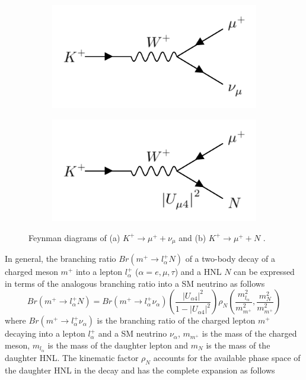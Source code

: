 \begin{figure}[ht!]
\begin{subfigure}[h]{0.4\linewidth}
\centering    
\includegraphics[width=\linewidth]{K_to_nu}
\caption{}
\end{subfigure}
\hfill
\begin{subfigure}[h]{0.4\linewidth}
\centering    
\includegraphics[width=\linewidth]{K_to_HNL}
\caption{}
\end{subfigure}%
\caption[kaonDiagram]{
	Feynman diagrams of (a) $K^+ \rightarrow \mu^+ + \nu_{\mu}$ and (b) $K^+ \rightarrow \mu^+ + N$ \cite{DavidePhD}.
}\label{fig:kaonDiagram}
\end{figure}

In general, the branching ratio $Br(m^+\rightarrow l^{+}_{\alpha}N)$ of a two-body decay of a charged meson $m^+$ into a lepton $l^{+}_{\alpha}$ ($\alpha=e,\mu,\tau$) and a HNL $N$ can be expressed in terms of the analogous branching ratio into a SM neutrino as follows \cite{HNLKelly}
\begin{equation}
	\label{eq:kaon_decay_hnl}
	Br(m^+\rightarrow l^{+}_{\alpha}N) = Br(m^+\rightarrow l^{+}_{\alpha}\nu_{\alpha})\left(\frac{|U_{\alpha 4}|^{2}}{1 - |U_{\alpha 4}|^{2}}\right)\rho_{N}\left(\frac{m^{2}_{l_{\alpha}}}{m^{2}_{m^+}}, \frac{m^{2}_{N}}{m^{2}_{m^+}} \right) 
\end{equation}
where $Br(m^+\rightarrow l^{+}_{\alpha}\nu_{\alpha})$ is the branching ratio of the charged lepton $m^+$ decaying into a lepton $l^+_{\alpha}$ and a SM neutrino $\nu_{\alpha}$, $m_{m^+}$ is the mass of the charged meson, $m_{l_{\alpha}}$ is the mass of the daughter lepton and $m_{N}$ is the mass of the daughter HNL.
The kinematic factor $\rho_{N}$ accounts for the available phase space of the daughter HNL in the decay and has the complete expansion as follows \cite{HNLKelly}


